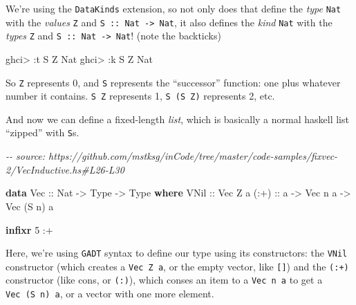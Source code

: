 \documentclass[]{article}
\newenvironment{Shaded}{}{}
\newcommand{\CommentTok}[1]{\textcolor[rgb]{0.38,0.63,0.69}{\textit{#1}}}
\newcommand{\DataTypeTok}[1]{\textcolor[rgb]{0.56,0.13,0.00}{#1}}
\newcommand{\DecValTok}[1]{\textcolor[rgb]{0.25,0.63,0.44}{#1}}
\newcommand{\KeywordTok}[1]{\textcolor[rgb]{0.00,0.44,0.13}{\textbf{#1}}}
\newcommand{\NormalTok}[1]{#1}
\newcommand{\OperatorTok}[1]{\textcolor[rgb]{0.40,0.40,0.40}{#1}}
\newcommand{\OtherTok}[1]{\textcolor[rgb]{0.00,0.44,0.13}{#1}}
\begin{document}
We're using the \texttt{DataKinds} extension, so not only does that define the
\emph{type} \texttt{Nat} with the \emph{values} \texttt{Z} and
\texttt{S\ ::\ Nat\ -\textgreater{}\ Nat}, it also defines the \emph{kind}
\texttt{Nat} with the \emph{types} \texttt{\textquotesingle{}Z} and
\texttt{\textquotesingle{}S\ ::\ Nat\ -\textgreater{}\ Nat}! (note the
backticks)

\begin{Shaded}
\begin{Highlighting}[]
\NormalTok{ghci}\OperatorTok{>} \OperatorTok{:}\NormalTok{t }\DataTypeTok{S} \DataTypeTok{Z}
\DataTypeTok{Nat}
\NormalTok{ghci}\OperatorTok{>} \OperatorTok{:}\NormalTok{k }\DataTypeTok{\textquotesingle{}S} \DataTypeTok{\textquotesingle{}Z}
\DataTypeTok{Nat}
\end{Highlighting}
\end{Shaded}

So \texttt{\textquotesingle{}Z} represents 0, and \texttt{\textquotesingle{}S}
represents the ``successor'' function: one plus whatever number it contains.
\texttt{\textquotesingle{}S\ \textquotesingle{}Z} represents 1,
\texttt{\textquotesingle{}S\ (\textquotesingle{}S\ \textquotesingle{}Z)}
represents 2, etc.

And now we can define a fixed-length \emph{list}, which is basically a normal
haskell list ``zipped'' with \texttt{S}s.

\begin{Shaded}
\begin{Highlighting}[]
\CommentTok{{-}{-} source: https://github.com/mstksg/inCode/tree/master/code{-}samples/fixvec{-}2/VecInductive.hs\#L26{-}L30}

\KeywordTok{data} \DataTypeTok{Vec}\OtherTok{ ::} \DataTypeTok{Nat} \OtherTok{{-}>} \DataTypeTok{Type} \OtherTok{{-}>} \DataTypeTok{Type} \KeywordTok{where}
    \DataTypeTok{VNil}\OtherTok{ ::} \DataTypeTok{Vec} \DataTypeTok{\textquotesingle{}Z}\NormalTok{ a}
\OtherTok{    (:+) ::}\NormalTok{ a }\OtherTok{{-}>} \DataTypeTok{Vec}\NormalTok{ n a }\OtherTok{{-}>} \DataTypeTok{Vec}\NormalTok{ (}\DataTypeTok{\textquotesingle{}S}\NormalTok{ n) a}

\KeywordTok{infixr} \DecValTok{5} \OperatorTok{:+}
\end{Highlighting}
\end{Shaded}

Here, we're using \texttt{GADT} syntax to define our type using its
constructors: the \texttt{VNil} constructor (which creates a
\texttt{Vec\ \textquotesingle{}Z\ a}, or the empty vector, like \texttt{{[}{]}})
and the \texttt{(:+)} constructor (like cons, or \texttt{(:)}), which conses an
item to a \texttt{Vec\ n\ a} to get a \texttt{Vec\ (\textquotesingle{}S\ n)\ a},
or a vector with one more element.
\end{document}
